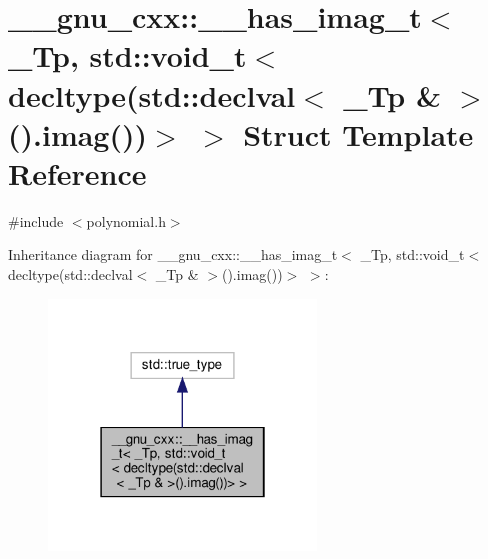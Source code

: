 \hypertarget{struct____gnu__cxx_1_1____has__imag__t_3_01__Tp_00_01std_1_1void__t_3_01decltype_07std_1_1declva705d5f96db36a5134d7de4531d29483c}{}\section{\+\_\+\+\_\+gnu\+\_\+cxx\+:\+:\+\_\+\+\_\+has\+\_\+imag\+\_\+t$<$ \+\_\+\+Tp, std\+:\+:void\+\_\+t$<$ decltype(std\+:\+:declval$<$ \+\_\+\+Tp \& $>$().imag())$>$ $>$ Struct Template Reference}
\label{struct____gnu__cxx_1_1____has__imag__t_3_01__Tp_00_01std_1_1void__t_3_01decltype_07std_1_1declva705d5f96db36a5134d7de4531d29483c}


{\ttfamily \#include $<$polynomial.\+h$>$}



Inheritance diagram for \+\_\+\+\_\+gnu\+\_\+cxx\+:\+:\+\_\+\+\_\+has\+\_\+imag\+\_\+t$<$ \+\_\+\+Tp, std\+:\+:void\+\_\+t$<$ decltype(std\+:\+:declval$<$ \+\_\+\+Tp \& $>$().imag())$>$ $>$\+:
\nopagebreak
\begin{figure}[H]
\begin{center}
\leavevmode
\includegraphics[width=202pt]{struct____gnu__cxx_1_1____has__imag__t_3_01__Tp_00_01std_1_1void__t_3_01decltype_07std_1_1declva57d94c7c383c14ae9cda8a5fc631a69e}
\end{center}
\end{figure}


